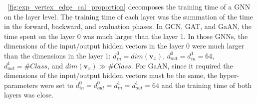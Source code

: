 \figurename~\ref{fig:exp_vertex_edge_cal_proportion} decomposes the training time of a GNN on the layer level.
%
The training time of each layer was the summation of the time in the forward, backward, and evaluation phases.
%
In GCN, GAT, and GaAN, the time spent on the layer 0 was much larger than the layer 1.
%
In those GNNs, the dimensions of the input/output hidden vectors in the layer 0 were much larger than the dimensions in the layer 1: $d^0_{in}=dim(\boldsymbol{v}_x)$, $d^0_{out}=d^1_{in}=64$, $d^1_{out}=\#Class$, and $dim(\boldsymbol{v}_x) \gg \#Class$.
%
For GaAN, since it required the dimensions of the input/output hidden vectors must be the same, the hyper-parameters were set to $d^0_{in}=d^0_{out}=d^1_{in}=d^1_{out}=64$ and the training time of both layers was close.

\begin{figure}[H]
    \centering
    \\

\end{figure}
